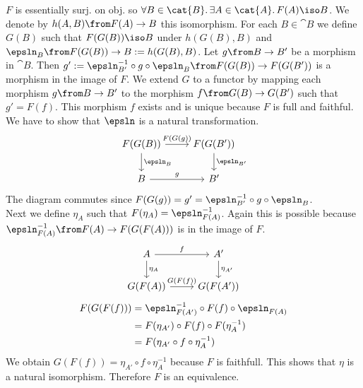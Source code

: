 \begin{answer}
\begin{itemize}
            $F$ is essentially surj. on obj. so $\forall B \in \cat{B}.\, \exists A \in \cat{A}.\, F(A) \iso B$.
            We denote by $h(A, B) \from F(A) \to B$ this isomorphism.
            For each $B \in \cat{B}$ we define $G(B)$ such that $F(G(B)) \iso B$ under $h(G(B), B)$ and $\epsln_B\from F(G(B)) \to B := h(G(B), B)$.
            Let $g\from B \to B'$ be a morphism in $\cat{B}$.
            Then $g' := \epsln_{B'}^{-1} \circ g \circ \epsln_{B} \from F(G(B)) \to F(G(B'))$ is a morphism in the image of $F$.
            We extend $G$ to a functor by mapping each morphism $g\from B \to B'$ to the morphism $f\from G(B) \to G(B')$ such that $g' = F(f)$.
            This morphism $f$ exists and is unique because $F$ is full and faithful.
            We have to show that $\epsln$ is a natural transformation.
            \[
                \begin{tikzcd}
                    F(G(B)) \arrow{d}{\epsln_{B}} \arrow{r}{F(G(g))} & F(G(B')) \arrow{d}{\epsln_{B'}} \\
                    B \arrow{r}{g}                                   & B'
                \end{tikzcd}
            \]
            The diagram commutes since $F(G(g)) = g' = \epsln_{B'}^{-1} \circ g \circ \epsln_{B}$.\\
            Next we define $\eta_A$ such that $F(\eta_A) = \epsln_{F(A)}^{-1}$.
            Again this is possible because $\epsln_{F(A)}^{-1}\from F(A) \to F(G(F(A)))$ is in the image of $F$.
            \[
                \begin{tikzcd}
                    A \arrow{d}{\eta_A} \arrow{r}{f} & A' \arrow{d}{\eta_{A'}} \\
                    G(F(A)) \arrow{r}{G(F(f))}       & G(F(A'))
                \end{tikzcd}
            \]
            \begin{align*}
                F(G(F(f))) & = \epsln_{F(A')}^{-1} \circ F(f) \circ \epsln_{F(A)}\\
                           & = F(\eta_{A'}) \circ F(f) \circ F(\eta_A^{-1})\\
                           & = F(\eta_{A'} \circ f \circ \eta_A^{-1})
            \end{align*}
            We obtain $G(F(f)) = \eta_{A'} \circ f \circ \eta_A^{-1}$ because $F$ is faithfull.
            This shows that $\eta$ is a natural isomorphism.
            Therefore $F$ is an equivalence.
    \end{itemize}
\end{answer}

